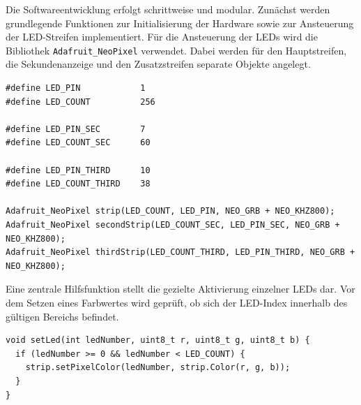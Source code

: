 





Die Softwareentwicklung erfolgt schrittweise und modular.  
Zunächst werden grundlegende Funktionen zur Initialisierung der Hardware sowie zur Ansteuerung der LED-Streifen implementiert.  
Für die Ansteuerung der LEDs wird die Bibliothek \texttt{Adafruit\_NeoPixel} verwendet.  
Dabei werden für den Hauptstreifen, die Sekundenanzeige und den Zusatzstreifen separate Objekte angelegt.

\begin{lstlisting}[style=arduino,caption={Initialisierung der LED-Streifen}]
#define LED_PIN            1
#define LED_COUNT          256

#define LED_PIN_SEC        7
#define LED_COUNT_SEC      60

#define LED_PIN_THIRD      10
#define LED_COUNT_THIRD    38

Adafruit_NeoPixel strip(LED_COUNT, LED_PIN, NEO_GRB + NEO_KHZ800);
Adafruit_NeoPixel secondStrip(LED_COUNT_SEC, LED_PIN_SEC, NEO_GRB + NEO_KHZ800);
Adafruit_NeoPixel thirdStrip(LED_COUNT_THIRD, LED_PIN_THIRD, NEO_GRB + NEO_KHZ800);
\end{lstlisting}

Eine zentrale Hilfsfunktion stellt die gezielte Aktivierung einzelner LEDs dar.  
Vor dem Setzen eines Farbwertes wird geprüft, ob sich der LED-Index innerhalb des gültigen Bereichs befindet.

\begin{lstlisting}[style=arduino,caption={Ansteuerung einer einzelnen LED}]
void setLed(int ledNumber, uint8_t r, uint8_t g, uint8_t b) {
  if (ledNumber >= 0 && ledNumber < LED_COUNT) {
    strip.setPixelColor(ledNumber, strip.Color(r, g, b));
  }
}
\end{lstlisting}

